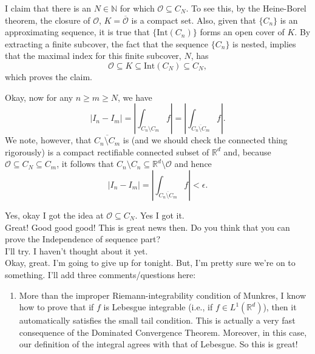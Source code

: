 \documentclass{article}
\theoremstyle{definition}
\begin{document}
\begin{framed}
I claim that there is an $N\in\mathbb{N}$ for which $\mathcal{O}\subseteq C_N$. To see this, by the Heine-Borel theorem, the closure of $\mathcal{O}$, $K=\overline{\mathcal{O}}$ is a compact set. Also, given that $\{C_n\}$ is an approximating sequence,  it is true that $\{\mbox{Int}(C_n)\}$ forms an open cover of $K$. By extracting a finite subcover, the fact that the sequence $\{C_n\}$ is nested, implies that the maximal index for this finite subcover, $N$, has
\begin{equation*}
\mathcal{O}\subseteq K\subseteq \mbox{Int}(C_N)\subseteq C_N,
\end{equation*}
which proves the claim.

Okay, now for any $n\geq m\geq N$, we have
\begin{equation*}
|I_n-I_m|=\left|\int_{C_n\setminus C_m}f\right|=\left|\int_{\overline{C_n\setminus C_m}} f\right|.
\end{equation*}
We note, however, that $\overline{C_n\setminus C_m}$ is (and we should check the connected thing rigorously) is a compact rectifiable connected subset of $\mathbb{R}^d$ and, because $\mathcal{O}\subseteq C_N\subseteq C_m$, it follows that $C_n\setminus C_n\subseteq \mathbb{R}^d\setminus \mathcal{O}$ and hence 
\begin{equation*}
|I_n-I_m|=\left|\int_{\overline{C_n\setminus C_m}} f\right|<\epsilon.
\end{equation*}


Yes, okay I got the idea at $\mathcal{O} \subseteq C_N$. Yes I got it.\\

Great! Good good good! This is great news then. Do you think that you can prove the Independence of sequence part?\\

I'll try. I haven't thought about it yet.\\

Okay, great. I'm going to give up for tonight. But, I'm pretty sure we're on to something. I'll add three comments/questions here:

\begin{enumerate}
\item More than the improper Riemann-integrability condition of Munkres, I know how to prove that if $f$ is Lebesgue integrable (i.e., if $f\in L^1(\mathbb{R}^d)$), then it automatically satisfies the small tail condition. This is actually a very fast consequence of the Dominated Convergence Theorem. Moreover, in this case, our definition of the integral agrees with that of Lebesgue. So this is great!


\end{enumerate}
\end{framed}
\end{document}
